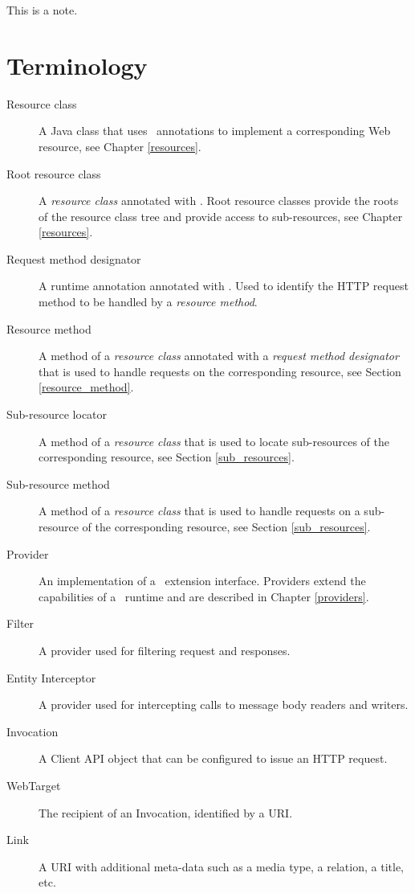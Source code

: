 \begin{nnnote*}
This is a note.
\end{nnnote*}

\section{Terminology}
\label{terminology}

\begin{description}
\item[Resource class] A Java class that uses \jaxrs\ annotations to implement a corresponding Web resource, see Chapter \ref{resources}.
\item[Root resource class] A {\em resource class} annotated with \Path. Root resource classes provide the roots of the resource class tree and provide access to sub-resources, see Chapter \ref{resources}.
\item[Request method designator] A runtime annotation annotated with \HttpMethod. Used to identify the HTTP request method to be handled by a {\em resource method}.
\item[Resource method] A method of a {\em resource class} annotated with a {\em request method designator} that is used to handle requests on the corresponding resource, see Section \ref{resource_method}.
\item[Sub-resource locator] A method of a {\em resource class} that is used to locate sub-resources of the corresponding resource, see Section \ref{sub_resources}.
\item[Sub-resource method] A method of a {\em resource class} that is used to handle requests on a sub-resource of the corresponding resource, see Section \ref{sub_resources}.
\item[Provider] An implementation of a \jaxrs\ extension interface. Providers extend the capabilities of a \jaxrs\ runtime and are described in Chapter \ref{providers}.
\item[Filter] A provider used for filtering request and responses.
\item[Entity Interceptor] A provider used for intercepting calls to message body readers and writers.
\item[Invocation] A Client API object that can be configured to issue an HTTP request.
\item[WebTarget] The recipient of an Invocation, identified by a URI.
\item[Link] A URI with additional meta-data such as a media type, a relation, a title, etc.

\end{description}

